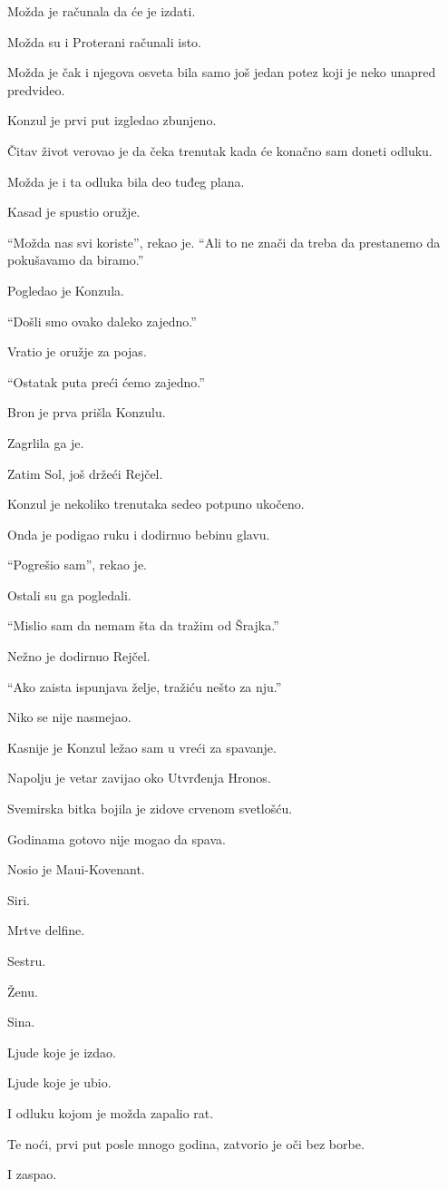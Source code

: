 Možda je računala da će je izdati.

Možda su i Proterani računali isto.

Možda je čak i njegova osveta bila samo još jedan potez koji je neko unapred predvideo.

Konzul je prvi put izgledao zbunjeno.

Čitav život verovao je da čeka trenutak kada će konačno sam doneti odluku.

Možda je i ta odluka bila deo tuđeg plana.

Kasad je spustio oružje.

``Možda nas svi koriste'', rekao je. ``Ali to ne znači da treba da prestanemo da pokušavamo da biramo.''

Pogledao je Konzula.

``Došli smo ovako daleko zajedno.''

Vratio je oružje za pojas.

``Ostatak puta preći ćemo zajedno.''

\bigskip

Bron je prva prišla Konzulu.

Zagrlila ga je.

Zatim Sol, još držeći Rejčel.

Konzul je nekoliko trenutaka sedeo potpuno ukočeno.

Onda je podigao ruku i dodirnuo bebinu glavu.

``Pogrešio sam'', rekao je.

Ostali su ga pogledali.

``Mislio sam da nemam šta da tražim od Šrajka.''

Nežno je dodirnuo Rejčel.

``Ako zaista ispunjava želje, tražiću nešto za nju.''

Niko se nije nasmejao.

\bigskip

Kasnije je Konzul ležao sam u vreći za spavanje.

Napolju je vetar zavijao oko Utvrđenja Hronos.

Svemirska bitka bojila je zidove crvenom svetlošću.

Godinama gotovo nije mogao da spava.

Nosio je Maui-Kovenant.

Siri.

Mrtve delfine.

Sestru.

Ženu.

Sina.

Ljude koje je izdao.

Ljude koje je ubio.

I odluku kojom je možda zapalio rat.

Te noći, prvi put posle mnogo godina, zatvorio je oči bez borbe.

I zaspao.
